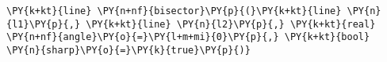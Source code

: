 \begin{Verbatim}[commandchars=\\\{\}]
    \PY{k+kt}{line} \PY{n+nf}{bisector}\PY{p}{(}\PY{k+kt}{line} \PY{n}{l1}\PY{p}{,} \PY{k+kt}{line} \PY{n}{l2}\PY{p}{,} \PY{k+kt}{real} \PY{n+nf}{angle}\PY{o}{=}\PY{l+m+mi}{0}\PY{p}{,} \PY{k+kt}{bool} \PY{n}{sharp}\PY{o}{=}\PY{k}{true}\PY{p}{)}
\end{Verbatim}
